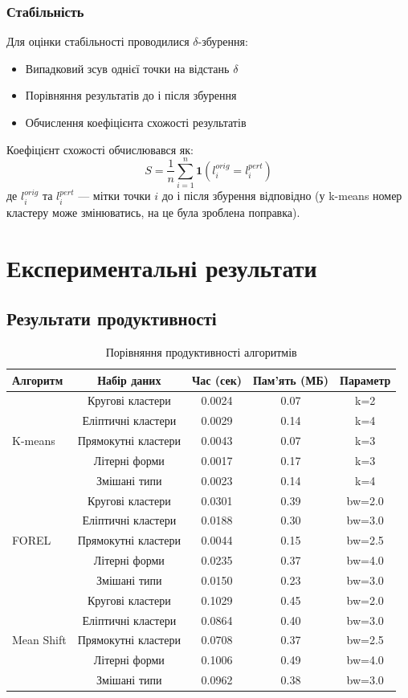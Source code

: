 \documentclass[12pt,a4paper]{article}
\begin{document}
\subsubsection{Стабільність}
Для оцінки стабільності проводилися $\delta$-збурення:
\begin{itemize}
    \item Випадковий зсув однієї точки на відстань $\delta$
    \item Порівняння результатів до і після збурення
    \item Обчислення коефіцієнта схожості результатів
\end{itemize}

Коефіцієнт схожості обчислювався як:
$$S = \frac{1}{n}\sum_{i=1}^{n} \mathbf{1}(l_i^{orig} = l_i^{pert})$$
де $l_i^{orig}$ та $l_i^{pert}$ — мітки точки $i$ до і після збурення відповідно (у k-means номер кластеру може змінюватись, на це була зроблена поправка).

\section{Експериментальні результати}

\subsection{Результати продуктивності}

\begin{table}[H]
\centering
\caption{Порівняння продуктивності алгоритмів}
\label{tab:performance}
\begin{tabular}{@{}lcccc@{}}
\toprule
\textbf{Алгоритм} & \textbf{Набір даних} & \textbf{Час (сек)} & \textbf{Пам'ять (МБ)} & \textbf{Параметр} \\
\midrule
\multirow{5}{*}{K-means} 
& Кругові кластери & 0.0024 & 0.07 & k=2 \\
& Еліптичні кластери & 0.0029 & 0.14 & k=4 \\
& Прямокутні кластери & 0.0043 & 0.07 & k=3 \\
& Літерні форми & 0.0017 & 0.17 & k=3 \\
& Змішані типи & 0.0023 & 0.14 & k=4 \\
\midrule
\multirow{5}{*}{FOREL} 
& Кругові кластери & 0.0301 & 0.39 & bw=2.0 \\
& Еліптичні кластери & 0.0188 & 0.30 & bw=3.0 \\
& Прямокутні кластери & 0.0044 & 0.15 & bw=2.5 \\
& Літерні форми & 0.0235 & 0.37 & bw=4.0 \\
& Змішані типи & 0.0150 & 0.23 & bw=3.0 \\
\midrule
\multirow{5}{*}{Mean Shift} 
& Кругові кластери & 0.1029 & 0.45 & bw=2.0 \\
& Еліптичні кластери & 0.0864 & 0.40 & bw=3.0 \\
& Прямокутні кластери & 0.0708 & 0.37 & bw=2.5 \\
& Літерні форми & 0.1006 & 0.49 & bw=4.0 \\
& Змішані типи & 0.0962 & 0.38 & bw=3.0 \\
\bottomrule
\end{tabular}
\end{table}
\end{document}
